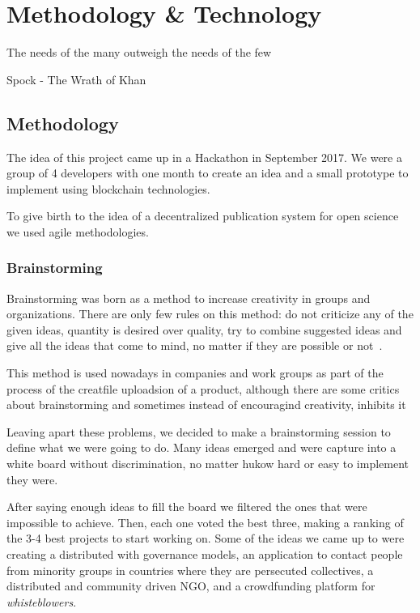 \chapter{Methodology \& Technology}

\begin{FraseCelebre}
  \begin{Frase}
    The needs of the many outweigh the needs of the few
  \end{Frase}
  \begin{Fuente}
    Spock - The Wrath of Khan
  \end{Fuente}
\end{FraseCelebre}

\section{Methodology}
The idea of this project came up in a Hackathon in September 2017. We were a
group of 4 developers with one month to create an idea and a small prototype to
implement using blockchain technologies.

To give birth to the idea of a decentralized publication system for open science
we used agile methodologies.


\subsection{Brainstorming}

Brainstorming was born as a method to increase creativity in groups and
organizations. There are only few rules on this method: do not criticize any of
the given ideas, quantity is desired over quality, try to combine suggested
ideas and give all the ideas that come to mind, no matter if they are possible
or not~\cite{osborn1953applied}.

This method is used nowadays in companies and work groups as part of the process
of the creatfile uploadsion of a product, although there are some critics about
brainstorming and sometimes instead of encouragind creativity, inhibits
it~\cite{sutton1996brainstorming,mullen1991productivity}

Leaving apart these problems, we decided to make a brainstorming session to
define what we were going to do. Many ideas emerged and were capture into a
white board without discrimination, no matter hukow hard or easy to implement
they were.

After saying enough ideas to fill the board we filtered the ones that were
impossible to achieve. Then, each one voted the best three, making a ranking of
the 3-4 best projects to start working on. Some of the ideas we came up to were
creating a distributed  with governance models, an application to
contact people from minority groups in countries where they are persecuted
collectives, a distributed and community driven NGO, and a crowdfunding platform
for \emph{whisteblowers}.

